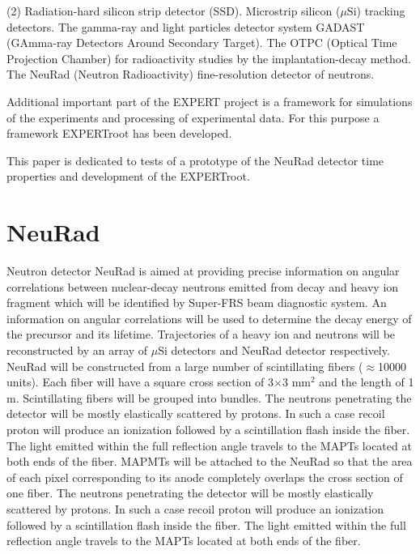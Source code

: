 \documentclass{webofc}
\begin{document}
\begin{tasks}(2)
	\task Radiation-hard silicon strip detector (SSD).
	\task Microstrip silicon ($\mu$Si) tracking detectors.
	\task The gamma-ray and light particles detector system GADAST (GAmma-ray Detectors Around Secondary Target).
	\task The OTPC (Optical Time Projection Chamber) for radioactivity studies by the implantation-decay method.
	\task The NeuRad (Neutron Radioactivity) fine-resolution detector of neutrons.
\end{tasks}

Additional important part of the EXPERT project is a framework for simulations of the experiments and processing of experimental data. For this purpose a framework EXPERTroot \cite{er} has been developed. %

This paper is dedicated to tests of a prototype of the NeuRad detector time properties and development of the EXPERTroot.

\section{NeuRad}
Neutron detector NeuRad is aimed at providing precise information on angular correlations between nuclear-decay neutrons emitted from decay and heavy ion fragment which will be identified by Super-FRS beam diagnostic system. An information on angular correlations will be used to determine the decay energy of the precursor and its lifetime. Trajectories of a heavy ion and neutrons will be reconstructed by an array of $\mu$Si detectors and NeuRad detector respectively. %
NeuRad will be constructed from a large number of scintillating fibers ($\approx$10000 units). Each fiber will have a square cross section of 3$\times$3 mm$^2$ and the length of 1 m. Scintillating fibers will be grouped into bundles. 
The neutrons penetrating the detector will be mostly elastically scattered by protons. In such a case recoil proton will produce an ionization followed by a scintillation flash inside the fiber. The light emitted within the full reflection angle travels to the MAPTs located at both ends of the fiber.
MAPMTs will be attached to the NeuRad so that the area of each pixel corresponding to its anode completely overlaps the cross section of one fiber.
The neutrons penetrating the detector will be mostly elastically scattered by protons. In such a case recoil proton will produce an ionization followed by a scintillation flash inside the fiber. The light emitted within the full reflection angle travels to the MAPTs located at both ends of the fiber.
\end{document}
